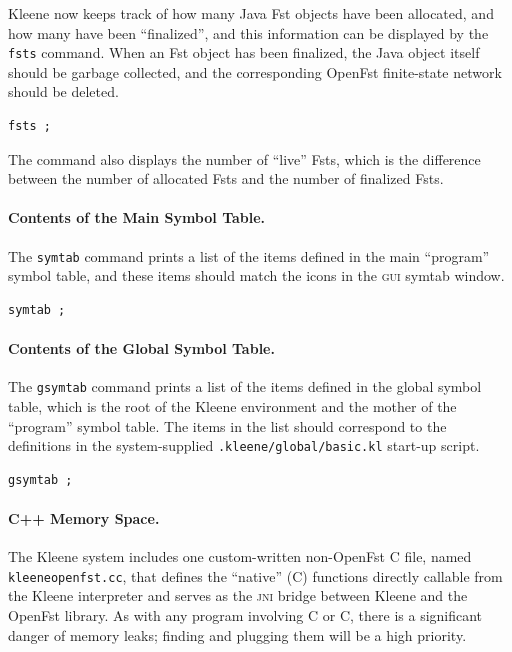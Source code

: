 \documentclass[letterpaper,12pt]{article}
\newcommand{\acro}{\textsc}
\def\CPP{{C\nolinebreak[4]\hspace{-.08em}\raisebox{.3ex}{\footnotesize\bf
+}\nolinebreak\hspace{-.1em}\raisebox{.3ex}{\footnotesize\bf +}}}
\begin{document}
Kleene now keeps track of how many Java Fst objects have been allocated,
and how many have been ``finalized'', and this information can be
displayed by the \texttt{fsts} command.  When an Fst object has been
finalized, the Java object itself should be garbage collected, and the
corresponding OpenFst finite-state network should be deleted.

\begin{Verbatim}[fontsize=\small]
fsts ;
\end{Verbatim}

\noindent
The command also displays the number of ``live'' Fsts, which is the
difference between the number of allocated Fsts and the number of finalized Fsts.

\paragraph{Contents of the Main Symbol Table.}

The \texttt{symtab} command prints a list of the items defined in the main
``program'' symbol table, and these items should match the icons in the \acro{gui} symtab
window.

\begin{Verbatim}[fontsize=\small]
symtab ;
\end{Verbatim}

\paragraph{Contents of the Global Symbol Table.}

The \texttt{gsymtab} command prints a list of the items defined in the global symbol
table, which is the root of the Kleene environment and the mother of the
``program'' symbol table.  The items in the list should correspond to the definitions
in the system-supplied \texttt{.kleene/global/basic.kl} start-up script.

\begin{Verbatim}[fontsize=\small]
gsymtab ;
\end{Verbatim}

\paragraph{C++ Memory Space.}

The Kleene system includes one custom-written non-OpenFst \CPP{} file,
named \texttt{kleeneopenfst.cc}, that defines the ``native'' (\CPP{})
functions directly callable from the Kleene interpreter and serves as the
\acro{jni} bridge between Kleene and the OpenFst library.  As with any
program involving C or \CPP{}, there is a significant danger of memory
leaks; finding and plugging them will be a high priority.
\end{document}
